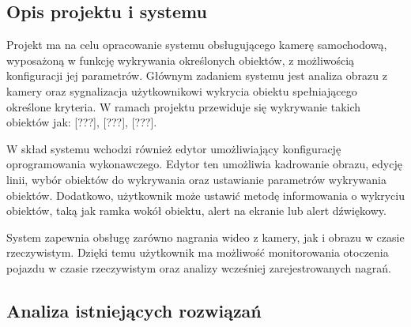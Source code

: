     \subsection{Opis projektu i systemu}
    Projekt ma na celu opracowanie systemu obsługującego kamerę samochodową, wyposażoną 
    w funkcję wykrywania określonych obiektów, z możliwością konfiguracji jej parametrów. 
    Głównym zadaniem systemu jest analiza obrazu z kamery oraz sygnalizacja użytkownikowi wykrycia 
    obiektu spełniającego określone kryteria. 
    W ramach projektu przewiduje się wykrywanie takich obiektów jak: [???], [???], [???].

    W skład systemu wchodzi również edytor umożliwiający konfigurację oprogramowania wykonawczego. 
    Edytor ten umożliwia kadrowanie obrazu, edycję linii, wybór obiektów do wykrywania oraz ustawianie 
    parametrów wykrywania obiektów. Dodatkowo, użytkownik może ustawić metodę informowania o wykryciu obiektów, 
    taką jak ramka wokół obiektu, alert na ekranie lub alert dźwiękowy.

    System zapewnia obsługę zarówno nagrania wideo z kamery, jak i obrazu w czasie rzeczywistym. 
    Dzięki temu użytkownik ma możliwość monitorowania otoczenia pojazdu w czasie rzeczywistym oraz analizy
    wcześniej zarejestrowanych nagrań. 

    \subsection{Analiza istniejących rozwiązań} %
